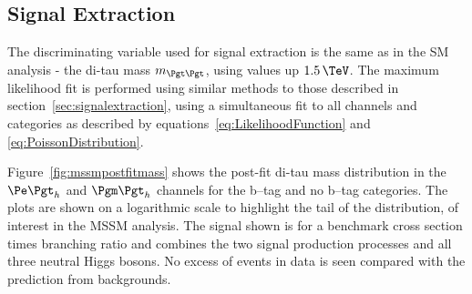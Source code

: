 \subsection{Signal Extraction}
\label{sec:mssmSignalExtraction}

The discriminating variable used for signal extraction is the same as in the
\ac{SM} analysis - the di-tau mass $m_{\Pgt\Pgt}$, using values up $1.5\,\TeV$.
The maximum likelihood fit is performed using similar methods to those described in 
section~\ref{sec:signalextraction}, using a simultaneous fit to all channels and
categories as described by equations~\ref{eq:LikelihoodFunction} and \ref{eq:PoissonDistribution}.

Figure~\ref{fig:mssmpostfitmass} shows the post-fit di-tau mass distribution in the
$\etau$ and $\mutau$ channels for the b--tag and no b--tag categories. The plots
are shown on a logarithmic scale to highlight the tail of the distribution, of
interest in the \ac{MSSM} analysis. The signal shown is for a benchmark cross
section times branching ratio and combines the two signal production processes
and all three neutral Higgs bosons. No excess of events in data is seen compared 
with the prediction from backgrounds.

